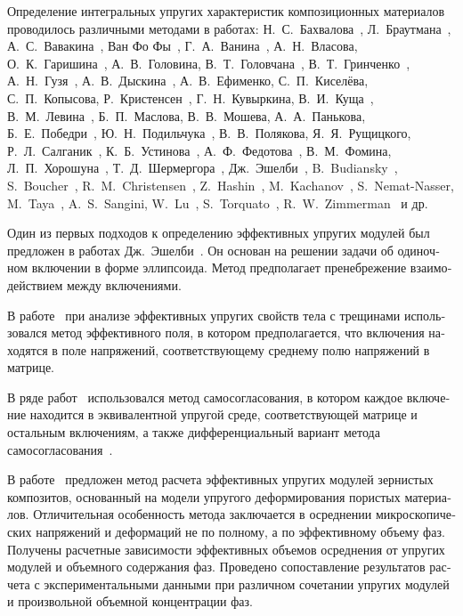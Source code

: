 \begin{russian}
Определение интегральных упругих характеристик композиционных материалов проводилось различными методами в работах: Н.~С.~Бахвалова~\cite{Bahvalov}, Л.~Браутмана~\cite{Brautman}, А.~С.~Вавакина~\cite{Vavakin}, Ван Фо Фы~\cite{VanFoFiKo1971, VanFoFi1971}, Г.~А.~Ванина~\cite{Vanin1985, Vanin1994, Vanin1976, Vanin1980, Vanin1977}, А.~Н.~Власова, О.~К.~Гаришина~\cite{Garishin}, А.~В.~Головина, В.~Т.~Головчана~\cite{Golovchan1974, Golovchan1993, Golovchan1987, Golovchan2000}, В.~Т.~Гринченко~\cite{Grinchenko1965, Grinchenko1967, Grinchenko1985, Grinchenko1978}, А.~Н.~Гузя~\cite{Guz1968}, А.~В.~Дыскина~\cite{Diskin}, А.~В.~Ефименко, С.~П.~Киселёва, С.~П.~Копысова, Р.~Кристенсен~\cite{Kristensen}, Г.~Н.~Кувыркина, В.~И.~Куща~\cite{Kusch1995}, В.~М.~Левина~\cite{Levin}, Б.~П.~Маслова, В.~В.~Мошева, А.~А.~Панькова, Б.~Е.~Победри~\cite{Pobedrya}, Ю.~Н.~Подильчука~\cite{Podilchuk1967, Podilchuk1984}, В.~В.~Полякова, Я.~Я.~Рущицкого, Р.~Л.~Салганик~\cite{Salganik}, К.~Б.~Устинова~\cite{Ustinov}, А.~Ф.~Федотова~\cite{Fedotov}, В.~М.~Фомина, Л.~П.~Хорошуна~\cite{Khoroshun, Khoroshun2000-1, Khoroshun2000-2}, Т.~Д.~Шермергора~\cite{Schermergor}, Дж.~Эшелби~\cite{Eshelbi, Eshelby}, B.~Budiansky~\cite{Budiansky}, S.~Boucher~\cite{Boucher}, R.~M.~Christensen~\cite{Christensen, Christensen1990}, Z.~Hashin~\cite{Hashin, Hashin1983, Hashin1988, Hashin1963}, M.~Kachanov~\cite{Kachanov}, S.~Nemat-Nasser, M.~Taya~\cite{Nemat-Nasser}, A.~S.~Sangini, W.~Lu~\cite{Sangini}, S.~Torquato~\cite{Torquato}, R.~W.~Zimmerman~\cite{Zimmerman} и др.{\sloppy\par}

Один из первых подходов к определению эффективных упругих модулей был предложен в работах Дж.~Эшелби~\cite{Eshelbi, Eshelby}. Он основан на решении задачи об одиночном включении в форме эллипсоида. Метод предполагает пренебрежение взаимодействием между включениями.

В работе~\cite{Kachanov} при анализе эффективных упругих свойств тела с трещинами использовался метод эффективного поля, в котором предполагается, что включения находятся в поле напряжений, соответствующему среднему полю напряжений в матрице.

В ряде работ~\cite{Christensen1990} использовался метод самосогласования, в котором каждое включение находится в эквивалентной упругой среде, соответствующей матрице и остальным включениям, а также дифференциальный вариант метода самосогласования~\cite{Salganik, Vavakin, Zimmerman}.

В работе~\cite{Fedotov} предложен метод расчета эффективных упругих модулей зернистых композитов, основанный на модели упругого деформирования пористых материалов. Отличительная особенность метода заключается в осреднении микроскопических напряжений и деформаций не по полному, а по эффективному объему фаз. Получены расчетные зависимости эффективных объемов осреднения от упругих модулей и объемного содержания фаз. Проведено сопоставление результатов расчета с экспериментальными данными при различном сочетании упругих модулей и произвольной объемной концентрации фаз.


\end{russian}
